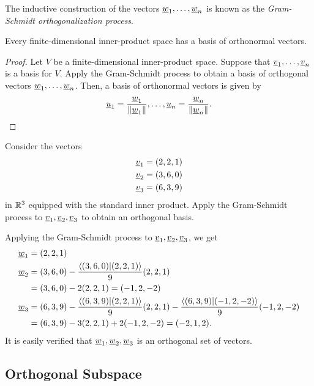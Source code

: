 The inductive construction of the vectors $\underline{w}_1, \ldots, \underline{w}_n$ is known as the \emph{Gram-Schmidt orthogonalization process}.

\begin{corollary}
\label{cor:orthonormal_basis}
Every finite-dimensional inner-product space has a basis of orthonormal vectors.
\end{corollary}
\begin{proof}
Let $V$ be a finite-dimensional inner-product space.
Suppose that $\underline{v}_1, \ldots, \underline{v}_n$ is a basis for $V$.
Apply the Gram-Schmidt process to obtain a basis of orthogonal vectors $\underline{w}_1, \ldots, \underline{w}_n$.
Then, a basis of orthonormal vectors is given by
\begin{equation*}
\underline{u}_1 = \frac{ \underline{w}_1 }{ \left\| \underline{w}_1 \right\| }, \ldots,
\underline{u}_n = \frac{ \underline{w}_n }{ \left\| \underline{w}_n \right\| }.
\end{equation*}
\end{proof}

\begin{example}
Consider the vectors
\begin{align*}
\underline{v}_1 &= (2,2,1) \\
\underline{v}_2 &= (3,6,0) \\
\underline{v}_3 &= (6,3,9)
\end{align*}
in $\mathbb{R}^3$ equipped with the standard inner product.
Apply the Gram-Schmidt process to $\underline{v}_1, \underline{v}_2, \underline{v}_3$ to obtain an orthogonal basis.

Applying the Gram-Schmidt process to $\underline{v}_1, \underline{v}_2, \underline{v}_3$, we get
\begin{align*}
\underline{w}_1 &= (2,2,1) \\
\underline{w}_2 &= (3,6,0)
- \frac{ \left\langle (3,6,0) | (2,2,1) \right\rangle }{ 9 } (2,2,1) \\
&= (3,6,0) - 2 (2,2,1) = (-1,2,-2) \\
\underline{w}_3 &= (6,3,9)
- \frac{ \left\langle (6,3,9) | (2,2,1) \right\rangle }{ 9 } (2,2,1)
- \frac{ \left\langle (6,3,9) | (-1,2,-2) \right\rangle }{ 9 } (-1,2,-2) \\
&= (6,3,9) - 3 (2,2,1) + 2 (-1,2,-2) = (-2,1,2) .
\end{align*}
It is easily verified that $\underline{w}_1, \underline{w}_2, \underline{w}_3$ is an orthogonal set of vectors.
\end{example}


\subsection{Orthogonal Subspace}

